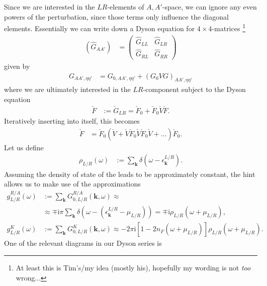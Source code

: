 \documentclass[english, parskip=full]{scrartcl}
\newcommand{\kla}{}
\newcommand{\klam}{}
\renewcommand{\i}{\text{i}}
\begin{document}
Since we are interested in the $LR$-elements of $A,A'$-space, we can ignore any even powers of the perturbation, since those terms only influence the diagonal elements.
Essentially we can write down a Dyson equation for $4\times 4$-matrices \footnote{At least this is Tim's/my idea (mostly his), hopefully my wording is not \emph{too} wrong...}
\begin{align}
\kla\left( \hat{G}_{AA'} \right) &= \begin{pmatrix}
\hat{G}_{LL} & \hat{G}_{LR} \\ \hat{G}_{RL} & \hat{G}_{RR}
\end{pmatrix}
\end{align}
given by
\begin{align}
G_{AA',\eta\eta'} &= G_{0,AA',\eta\eta'} + (G_0 V G)_{AA',\eta\eta'}
\end{align}
where we are ultimately interested in the $LR$-component subject to the Dyson equation
\begin{align}
\check{F} &:= \check{G}_{LR} = \check{F}_0 + \check{F}_0 \check{V} \check{F}.
\end{align}
Iteratively inserting into itself, this becomes
\begin{align}
\check{F} &= \check{F}_0 \kla\left( \check{V} + \check{V} \check{F}_0 \check{V} \check{F}_0 \check{V} + \dots \right) \check{F}_0.
\end{align}
Let us define
\begin{align}
\rho_{L/R} (\omega) &:= \sum_{\textbf{k}} \delta \kla\left( \omega - \epsilon_\textbf{k}^{L/R} \right).
\end{align}
Assuming the density of state of the leads to be approximately constant, the hint allows us to make use of the approximations
\begin{align}
g_{L/R}^{R/A}(\omega) &:= \sum_{\textbf{k}} G_{0,L/R}^{R/A}(\textbf{k}, \omega) \approx \\
&\approx \mp \i\pi \sum_{\textbf{k}} \delta \kla\left( \omega - \kla\left( \epsilon_{\textbf{k}}^{L/R} - \mu_{L/R} \right) \right) = \mp\i \rho_{L/R} \kla\left( \omega + \mu_{L/R} \right),\\
g_{L/R}^{K}(\omega) &:= \sum_{\textbf{k}} G_{0,L/R}^{K}(\textbf{k}, \omega) \approx -2\pi \i \klam\left[ 1 - 2n_F \kla\left( \omega + \mu_{L/R} \right) \right] \rho_{L/R}\left( \omega + \mu_{L/R} \right).
\end{align}
One of the relevant diagrams in our Dyson series is
\end{document}
